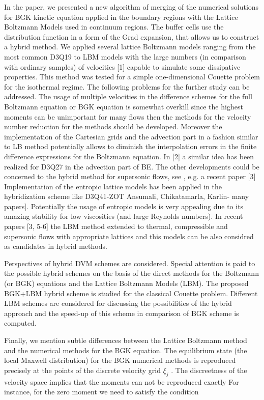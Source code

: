 \documentclass[]{elsarticle} %
\begin{document}
{In the paper, we presented a new algorithm  of merging of the numerical solutions for BGK kinetic equation  applied in the boundary regions with the Lattice Boltzmann Models used in continuum regions. The buffer cells use the distribution function in a form of the Grad expansion, that allows us to construct a hybrid method. We applied several lattice Boltzmann models ranging from the most common D3Q19 to LBM models with the large numbers (in comparison with ordinary samples) of  velocities [1] capable to simulate some dissipative properties. This method was tested for a simple one-dimensional Couette problem for the isothermal  regime.   The following problems for the further study can be addressed.
 The usage of multiple velocities in the  difference  schemes  for the full Boltzmann equation or BGK equation is somewhat overkill since  the highest moments  can be unimportant for many flows then the methods for the velocity number reduction for the methods should be developed.  Moreover the implementation of the  Cartesian grids and the advection part in a fashion similar  to LB method potentially allows to diminish the interpolation errors in the finite difference expressions for the Boltzmann equation. In [2] a similar idea has been realized for D3Q27 in the advection part of BE.
The other developments could be concerned to the hybrid method for supersonic flows, see , e.g. a recent paper [3] Implementation of the entropic lattice models has been applied in the hybridization scheme like D3Q41-ZOT Ansumali, Chikatamarla, Karlin- many papers]. Potentially the usage of entropic models is very appealing due to its amazing stability for low viscosities (and large Reynolds numbers). In recent papers [3, 5-6] the LBM method extended to thermal, compressible and supersonic  flows with appropriate lattices  and  this models  can be also considred as  candidates in hybrid methods.




Perspectives of hybrid DVM schemes are considered. Special attention is paid to the possible hybrid schemes on the basis of the direct methods for the Boltzmann (or BGK) equations and the Lattice Boltzmann Models (LBM). The proposed BGK+LBM hybrid scheme is studied for the classical Couette problem. Different LBM schemes are considered for discussing the possibilities of the hybrid approach and the speed-up of this scheme in comparison of BGK scheme is computed.


Finally, we  mention  subtle differences between the Lattice Boltzmann method  and  the numerical methods for the BGK equation. The  equilibrium state (the local Maxwell distribution) for the BGK numerical methods is reproduced precisely at the points of the discrete velocity grid $\xi_j$ . The discreetness of the velocity space  implies that the moments can not be reproduced exactly %
For instance, for the zero moment we need to satisfy the condition

}
\end{document}
